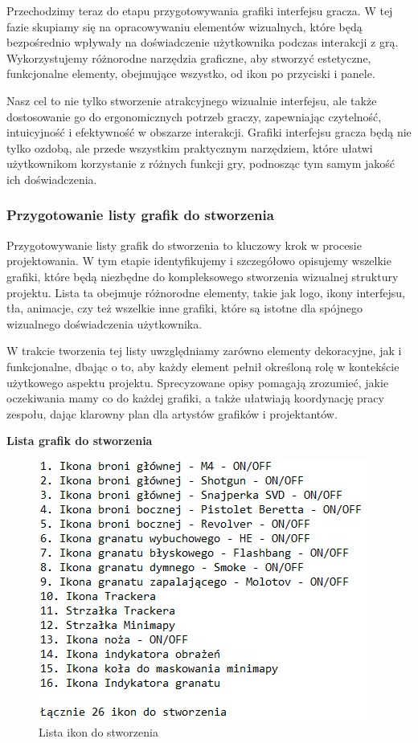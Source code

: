 Przechodzimy teraz do etapu przygotowywania grafiki interfejsu gracza. W tej fazie skupiamy się na opracowywaniu elementów wizualnych, które będą bezpośrednio wpływały na doświadczenie użytkownika podczas interakcji z grą. Wykorzystujemy różnorodne narzędzia graficzne, aby stworzyć estetyczne, funkcjonalne elementy, obejmujące wszystko, od ikon po przyciski i panele.

Nasz cel to nie tylko stworzenie atrakcyjnego wizualnie interfejsu, ale także dostosowanie go do ergonomicznych potrzeb graczy, zapewniając czytelność, intuicyjność i efektywność w obszarze interakcji. Grafiki interfejsu gracza będą nie tylko ozdobą, ale przede wszystkim praktycznym narzędziem, które ułatwi użytkownikom korzystanie z różnych funkcji gry, podnosząc tym samym jakość ich doświadczenia.

\subsubsection{Przygotowanie listy grafik do stworzenia}

Przygotowywanie listy grafik do stworzenia to kluczowy krok w procesie projektowania. W tym etapie identyfikujemy i szczegółowo opisujemy wszelkie grafiki, które będą niezbędne do kompleksowego stworzenia wizualnej struktury projektu. Lista ta obejmuje różnorodne elementy, takie jak logo, ikony interfejsu, tła, animacje, czy też wszelkie inne grafiki, które są istotne dla spójnego wizualnego doświadczenia użytkownika.

W trakcie tworzenia tej listy uwzględniamy zarówno elementy dekoracyjne, jak i funkcjonalne, dbając o to, aby każdy element pełnił określoną rolę w kontekście użytkowego aspektu projektu. Sprecyzowane opisy pomagają zrozumieć, jakie oczekiwania mamy co do każdej grafiki, a także ułatwiają koordynację pracy zespołu, dając klarowny plan dla artystów grafików i projektantów.

\begin{center}
{\bfseries Lista grafik do stworzenia}
\end{center}
\begin{figure}[h]
    \centering
    \includegraphics[scale=0.7]{Images/ListaIkon.jpg}
    \caption{Lista ikon do stworzenia}
\end{figure}
\FloatBarrier

